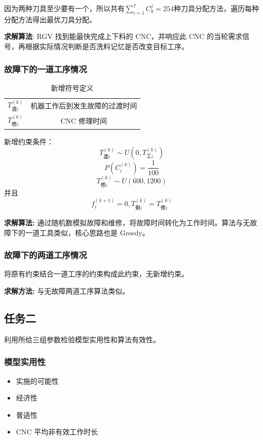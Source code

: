 \documentclass[12pt,a4paper]{article}
\begin{document}
因为两种刀具至少要有一个，所以共有$\sum_{i = 1}^7C_8^j = 254$种刀具分配方法，遍历每种分配方法得出最优刀具分配。

\textbf{求解算法}:
RGV 找到能最快完成上下料的 CNC，并响应此 CNC 的当轮需求信号，再根据实际情况判断是否洗料记忆是否改变目标工序。

\subsubsection{故障下的一道工序情况}
\begin{table}[!htbp]
  \caption{新增符号定义}
  \centering
  \begin{tabular}{c|c}
    \hline
    $T_{\text{渡}i}^{(k)}$ & 机器工作后到发生故障的过渡时间\\
    $T_{\text{修}i}^{(k)}$ & CNC 修理时间\\
    \hline
  \end{tabular}
\end{table}

新增约束条件：
\begin{equation*}
T_{\text{渡}i}^{(k)} \sim U(0,T_{工i}^{(k)})
\end{equation*}
\begin{equation*}
  P(C_i^{(k)}) = \frac{1}{100}
\end{equation*}
$$T_{\text{修}i}^{(k)} \sim U(600,1200)$$
并且 $$f_i^{(k+1)} = 0,T_{\text{剩}i}^{(k)} = T_{\text{修}i}^{(k)}$$

\textbf{求解算法:}
通过随机数模拟故障和维修，将故障时间转化为工作时间。算法与无故障下的一道工具类似，核心思路也是 Greedy。

\subsubsection{故障下的两道工序情况}
将原有约束结合一道工序的约束构成此约束，无新增约束。

\textbf{求解方法:}
与无故障两道工序算法类似。

\subsection{任务二}
利用所给三组参数检验模型实用性和算法有效性。
\subsubsection{模型实用性}
\begin{itemize}
  \item 实施的可能性
  \item 经济性
  \item 普适性
  \item CNC 平均非有效工作时长
\end{itemize}
\end{document}
